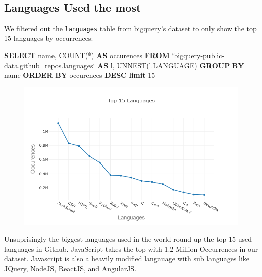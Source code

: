 \documentclass[11pt]{article}
\makeatletter
\def\maxwidth{\ifdim\Gin@nat@width>\linewidth\linewidth
    \else\Gin@nat@width\fi}
\let\Oldincludegraphics\includegraphics
\renewcommand{\includegraphics}[1]{\Oldincludegraphics[width=.8\maxwidth]{#1}}
\newenvironment{Shaded}{}{}
\newcommand{\KeywordTok}[1]{\textcolor[rgb]{0.00,0.44,0.13}{\textbf{{#1}}}}
\newcommand{\DecValTok}[1]{\textcolor[rgb]{0.25,0.63,0.44}{{#1}}}
\newcommand{\FunctionTok}[1]{\textcolor[rgb]{0.02,0.16,0.49}{{#1}}}
\newcommand{\NormalTok}[1]{{#1}}
\makeatother
\begin{document}
    \begin{center}
    \end{center}
    { \hspace*{\fill} \\}
    
    \subsection{Languages Used the most}\label{languages-used-the-most}

    We filtered out the \texttt{languages} table from bigquery's dataset to
only show the top 15 languages by occurrences:

\begin{Shaded}
\begin{Highlighting}[]
\KeywordTok{SELECT}
\NormalTok{  name,}
  \FunctionTok{COUNT}\NormalTok{(*) }\KeywordTok{AS}\NormalTok{ occurences}
\KeywordTok{FROM}
\NormalTok{  `bigquery-public-data.github_repos.languages` }\KeywordTok{AS}\NormalTok{ l,}
\NormalTok{  UNNEST(l.LANGUAGE)}
\KeywordTok{GROUP} \KeywordTok{BY}
\NormalTok{  name}
\KeywordTok{ORDER} \KeywordTok{BY}
\NormalTok{  occurences }\KeywordTok{DESC}
  \KeywordTok{limit} \DecValTok{15}
\end{Highlighting}
\end{Shaded}

\begin{figure}[H]
\centering
\includegraphics{newplot3.png}
\caption{}
\end{figure}

    Unsuprisingly the biggest languages used in the world round up the top
15 used languages in Github. JavaScript takes the top with 1.2 Million
Occurrences in our dataset. Javascript is also a heavily modified
langauage with sub languages like JQuery, NodeJS, ReactJS, and
AngularJS.
\end{document}
